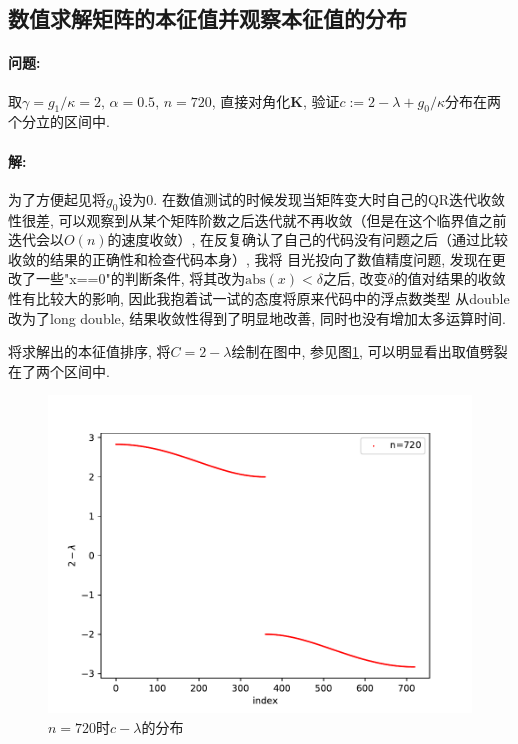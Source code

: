 \documentclass[a4paper,zihao=5,UTF8]{ctexart}
\newcommand{\mr}[1]{\mathrm{#1}}
\newcommand{\mb}[1]{\mathbf{#1}}
\begin{document}
	\subsection{数值求解矩阵的本征值并观察本征值的分布}
	\paragraph{问题:}取$\gamma = g_1/\kappa = 2,\,\alpha=0.5,\,n=720$, 
	直接对角化$\mb{K}$, 验证$c:=2-\lambda + g_0/\kappa$分布在两个分立的区间中.
	\paragraph{解:}
	为了方便起见将$g_0$设为0. 在数值测试的时候发现当矩阵变大时自己的QR迭代收敛性很差, 
	可以观察到从某个矩阵阶数之后迭代就不再收敛（但是在这个临界值之前迭代会以$O(n)$的速度收敛）, 
	在反复确认了自己的代码没有问题之后（通过比较收敛的结果的正确性和检查代码本身）, 我将
	目光投向了数值精度问题, 发现在更改了一些"x==0"的判断条件, 将其改为$\mr{abs}(x) < \delta$之后, 
	改变$\delta$的值对结果的收敛性有比较大的影响, 因此我抱着试一试的态度将原来代码中的浮点数类型
	从double改为了long double, 结果收敛性得到了明显地改善, 同时也没有增加太多运算时间. 
	\par 
	将求解出的本征值排序, 将$C = 2 - \lambda$绘制在图中, 参见图\ref{2 eigenvalue}, 可以明显看出取值劈裂
	在了两个区间中.
	\begin{figure}[htbp]
		\centering
		\includegraphics[scale=0.6]{2_eigenvalue.pdf}
		\caption{$n=720$时$c-\lambda$的分布}
		\label{2 eigenvalue}
	\end{figure}
\end{document}
